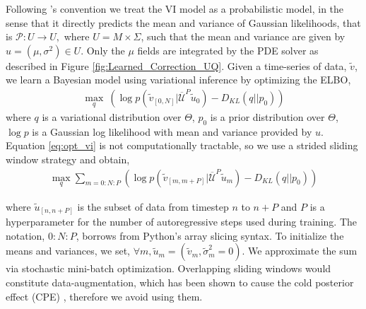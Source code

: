 Following \cite{blundell2015weight}'s convention we treat the VI model as a probabilistic model, in the sense that it directly predicts the mean and variance of Gaussian likelihoods, that is \(\mathcal{P}: U \rightarrow U,\) where $U=M\times \Sigma$, such that the mean and variance  are given by $u=(\mu,\sigma^2)\in U$. Only the $\mu$ fields are integrated by the PDE solver as described in Figure \ref{fig:Learned_Correction_UQ}. Given a time-series of data, $\tilde{v}$, we learn a Bayesian model using variational inference by optimizing the ELBO,
\begin{equation}\label{eq:opt_vi}
\begin{aligned}
    \max_{q}\ (\log p\left(\tilde{v}_{[0,N]}|\overline{\mathcal{U}}^P\tilde{u}_0 \right) - D_{KL}(q || p_0))
\end{aligned}
\end{equation}
where $q$ is a variational distribution over $\Theta$, $p_0$ is a prior distribution over $\Theta$,  $\log p$ is a Gaussian log likelihood with mean and variance provided by $u$. 
Equation \eqref{eq:opt_vi} is not computationally tractable, so we use a strided sliding window strategy and obtain,
\begin{equation}\label{eq:opt_vi2}
\begin{aligned}
    \max_{q} \sum_{m=0:N:P}(\log p\left(\tilde{v}_{[m,m+P]}|\overline{\mathcal{U}}^P\tilde{u}_m \right) - D_{KL}(q || p_0))
\end{aligned}
\end{equation}

where $\tilde{u}_{[n,n+P]}$ is the subset of data from timestep $n$ to $n+P$ and  $P$ is a hyperparameter for the number of autoregressive steps used during training. The notation, $0:N:P$, borrows from Python's array slicing syntax. To initialize the means and variances, we set, \(\forall m, \tilde u_m=(\tilde v_m, \tilde \sigma_m^2=0)\). We approximate the sum via stochastic mini-batch optimization. Overlapping sliding windows would constitute data-augmentation, which has been shown to cause the cold posterior effect (CPE) \cite{izmailov2021bayesian}, therefore we avoid using them.

